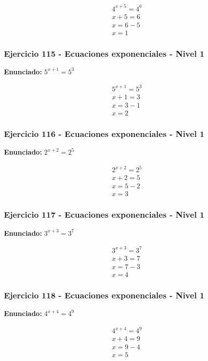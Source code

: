 \documentclass[12pt,a4paper]{article}
\begin{document}
\[
\begin{aligned}
4^{x+5}=4^{6}\\
x+5=6\\
x=6-5\\
\boxed{x=1}
\end{aligned}
\]


\subsubsection*{Ejercicio 115 - Ecuaciones exponenciales - Nivel 1}
\textbf{Enunciado:} \(5^{x+1}=5^{3}\)

\[
\begin{aligned}
5^{x+1}=5^{3}\\
x+1=3\\
x=3-1\\
\boxed{x=2}
\end{aligned}
\]


\subsubsection*{Ejercicio 116 - Ecuaciones exponenciales - Nivel 1}
\textbf{Enunciado:} \(2^{x+2}=2^{5}\)

\[
\begin{aligned}
2^{x+2}=2^{5}\\
x+2=5\\
x=5-2\\
\boxed{x=3}
\end{aligned}
\]


\subsubsection*{Ejercicio 117 - Ecuaciones exponenciales - Nivel 1}
\textbf{Enunciado:} \(3^{x+3}=3^{7}\)

\[
\begin{aligned}
3^{x+3}=3^{7}\\
x+3=7\\
x=7-3\\
\boxed{x=4}
\end{aligned}
\]


\subsubsection*{Ejercicio 118 - Ecuaciones exponenciales - Nivel 1}
\textbf{Enunciado:} \(4^{x+4}=4^{9}\)

\[
\begin{aligned}
4^{x+4}=4^{9}\\
x+4=9\\
x=9-4\\
\boxed{x=5}
\end{aligned}
\]
\end{document}
